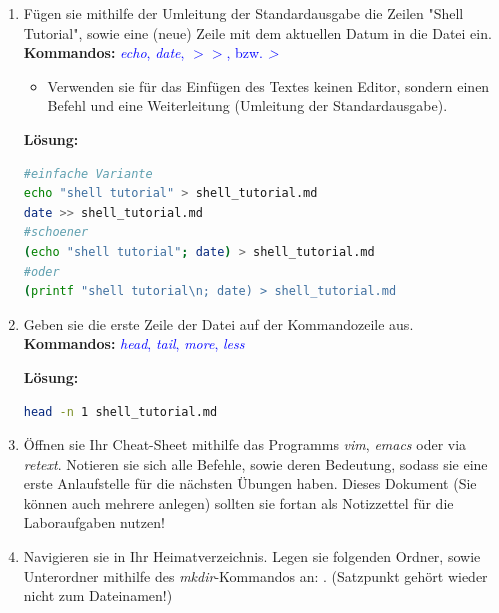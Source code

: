 \documentclass[paper=a4,fontsize=11pt]{scrartcl}%
\numberwithin{equation}{section}
\newenvironment{solution}
	{
		\color{blue}
		\textbf{Lösung:}
	}{}
\begin{document}
\begin{enumerate}
\begin{enumerate}[label=(\alph*)]
		\begin{solution}
        \begin{lstlisting}[style=Bash, language=Bash]
du -h shell_tutorial.md # Groesse in Bytes auf der Platte, 4KB ist die Standardblockgroesse, auch wenn die Datei kleiner ist.
ls -la shell_tutorial.md #in Bytes vor dem Datum
stat shell_tutorial.md # wie bei du
		\end{lstlisting}
		\end{solution}
		\item Fügen sie mithilfe der Umleitung der Standardausgabe die Zeilen "Shell Tutorial", sowie eine (neue) Zeile mit dem aktuellen Datum in die Datei  ein.\\
		\textbf{Kommandos:} \textcolor{blue}{\emph{echo}, \emph{date}, $>>$, bzw. \emph{>}}
		\begin{itemize}
			\item \small Verwenden sie für das Einfügen des Textes keinen Editor, sondern einen Befehl und eine Weiterleitung (Umleitung der Standardausgabe).
		\end{itemize}
		
		\begin{solution}
        \begin{lstlisting}[style=Bash, language=Bash]
#einfache Variante
echo "shell tutorial" > shell_tutorial.md
date >> shell_tutorial.md
#schoener
(echo "shell tutorial"; date) > shell_tutorial.md
#oder
(printf "shell tutorial\n; date) > shell_tutorial.md
		\end{lstlisting}
		\end{solution}
		\item Geben sie die erste Zeile der Datei  auf der Kommandozeile aus.\\
		\textbf{Kommandos:} \textcolor{blue}{\emph{head}, \emph{tail}, \emph{more}, \emph{less}}
		
		\begin{solution}
        \begin{lstlisting}[style=Bash, language=Bash]
head -n 1 shell_tutorial.md
		\end{lstlisting}
		\end{solution}
		\item Öffnen sie Ihr Cheat-Sheet mithilfe das Programms \emph{vim}, \emph{emacs} oder via \emph{retext}. Notieren sie sich alle Befehle, sowie deren Bedeutung, sodass sie eine erste Anlaufstelle für die nächsten Übungen haben. Dieses Dokument (Sie können auch mehrere anlegen) sollten sie fortan als Notizzettel für die Laboraufgaben nutzen!
		\item Navigieren sie in Ihr Heimatverzeichnis. Legen sie folgenden Ordner, sowie Unterordner mithilfe des \emph{mkdir}-Kommandos an: . (Satzpunkt gehört wieder nicht zum Dateinamen!)
		

\end{enumerate}
\end{enumerate}
\end{document}
